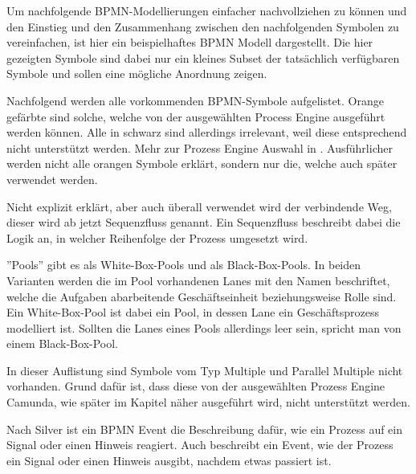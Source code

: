 \clearpage
{}  
Um nachfolgende \ac{BPMN}-Modellierungen einfacher nachvollziehen zu können und den Einstieg und den Zusammenhang zwischen den nachfolgenden Symbolen zu vereinfachen, ist hier ein beispielhaftes \ac{BPMN} Modell dargestellt. Die hier gezeigten Symbole sind dabei nur ein kleines Subset der tatsächlich verfügbaren Symbole und sollen eine mögliche Anordnung zeigen. 

Nachfolgend werden alle vorkommenden \ac{BPMN}-Symbole aufgelistet. Orange gefärbte sind solche, welche von der ausgewählten Process Engine ausgeführt werden können. Alle in schwarz sind allerdings irrelevant, weil diese entsprechend nicht unterstützt werden. Mehr zur Prozess Engine Auswahl in . Ausführlicher werden nicht alle orangen Symbole erklärt, sondern nur die, welche auch später verwendet werden.

Nicht explizit erklärt, aber auch überall verwendet wird der verbindende Weg,  dieser wird ab jetzt Sequenzfluss genannt. Ein Sequenzfluss beschreibt dabei die Logik an, in welcher Reihenfolge der Prozess umgesetzt wird. \citep[vgl.][S. 13]{bruce_englisch_2011} 

''Pools'' gibt es als White-Box-Pools und als Black-Box-Pools. In beiden Varianten werden die im Pool vorhandenen Lanes mit den Namen beschriftet, welche die Aufgaben abarbeitende Geschäftseinheit beziehungsweise Rolle sind. Ein White-Box-Pool ist dabei ein Pool, in dessen Lane ein Geschäftsprozess modelliert ist. Sollten die Lanes eines Pools allerdings leer sein, spricht man von einem Black-Box-Pool. \citep[vgl.][S. 55]{bruce_bpmn_2012}

\clearpage
{}

In dieser Auflistung sind Symbole vom Typ Multiple und Parallel Multiple nicht vorhanden. Grund dafür ist, dass diese von der ausgewählten Prozess Engine Camunda, wie später im Kapitel  näher ausgeführt wird, nicht unterstützt werden.

Nach Silver ist ein \ac{BPMN} Event die Beschreibung dafür, wie ein Prozess auf ein Signal oder einen Hinweis reagiert. Auch beschreibt ein Event, wie der Prozess ein Signal oder einen Hinweis ausgibt, nachdem etwas passiert ist. \citep[vgl.][S. 103]{bruce_bpmn_2012}

